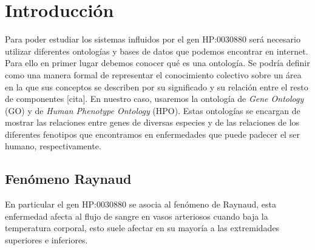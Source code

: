 \section{Introducción}

Para poder estudiar los sistemas influidos por el gen HP:0030880 será necesario utilizar diferentes ontologías y bases de datos que podemos encontrar en internet. Para ello en primer lugar debemos conocer qué es una ontología. Se podría definir como una manera formal de representar el conocimiento colectivo sobre un área en la que sus conceptos se describen por su significado y su relación entre el resto de componentes [cita]. En nuestro caso, usaremos la ontología de \textit{Gene Ontology} (GO) y de \textit{Human Phenotype Ontology} (HPO). Estas ontologías se encargan de mostrar las relaciones entre genes de diversas especies y de las relaciones de los diferentes fenotipos que encontramos en enfermedades que puede padecer el ser humano, respectivamente.

\subsection{Fenómeno Raynaud}

En particular el gen HP:0030880 se asocia al fenómeno de Raynaud, esta enfermedad afecta al flujo de sangre en vasos arteriosos cuando baja la temperatura corporal, esto suele afectar en su mayoría a las extremidades superiores e inferiores.
